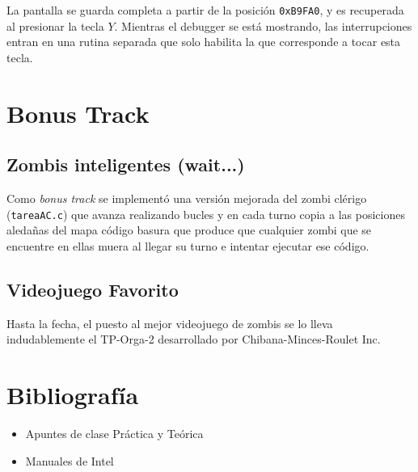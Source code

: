 \documentclass[a4paper]{article}
\begin{document}
La pantalla se guarda completa a partir de la posición \texttt{0xB9FA0}, y es recuperada al presionar la tecla $Y$. Mientras el debugger se está mostrando, las interrupciones entran en una rutina separada que solo habilita la que corresponde a tocar esta tecla.

\section{Bonus Track} %
\subsection{Zombis inteligentes (wait...)}
Como \textit{bonus track} se implementó una versión mejorada del zombi clérigo (\texttt{tareaAC.c}) que avanza realizando bucles y en cada turno copia a las posiciones aledañas del mapa código basura que produce que cualquier zombi que se encuentre en ellas muera al llegar su turno e intentar ejecutar ese código.

\subsection{Videojuego Favorito}
Hasta la fecha, el puesto al mejor videojuego de zombis se lo lleva indudablemente el TP-Orga-2 desarrollado por Chibana-Minces-Roulet Inc.

\section{Bibliografía}
\begin{itemize}
\item Apuntes de clase Práctica y Teórica
\item Manuales de Intel
\end{itemize}
\end{document}
